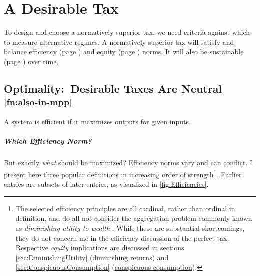 
\chapter[Desirable Tax]{A Desirable Tax}\label{chap:desirable-tax}





To design and choose a normatively superior tax, we need criteria against which to measure alternative regimes.
A normatively superior tax will satisfy and balance \hyperref[sec:Efficiency]{efficiency} (page \pageref{sec:Efficiency}) and \hyperref[sec:Equity]{equity} (page \pageref{sec:Equity}) norms.
It will also be \hyperref[sec:sustainability]{sustainable} (page \pageref{sec:Sustainability}) over time.

\section[Optimality]{Optimality:~Desirable Taxes Are Neutral \textsuperscript{\ref{fn:also-in-mpp}}} \label{sec:tax-optimality} %
A system is efficient if it maximizes outputs for given inputs.


\paragraph{Which Efficiency Norm?}
But exactly \emph{what} should be maximized?
Efficiency norms vary and can conflict.
I present here three popular definitions in increasing order of strength\footnote{
	The selected efficiency principles are all cardinal, rather than ordinal in definition, and do all not consider the aggregation problem commonly known as \emph{diminishing utility to wealth} \citep{Hicks1946}.
While these are substantial shortcomings, they do not concern me in the efficiency discussion of the perfect tax.
Respective \emph{equity} implications are discussed in sections \ref{sec:DiminishingUtility} (\hyperref[sec:DiminishingUtility]{diminishing returns}) and \ref{sec:ConspicuousConsumption} (\hyperref[sec:ConspicuousConsumption]{conspicuous consumption}).}.
Earlier entries are subsets of later entries, as visualized in \autoref{fig:Efficiencies}.

